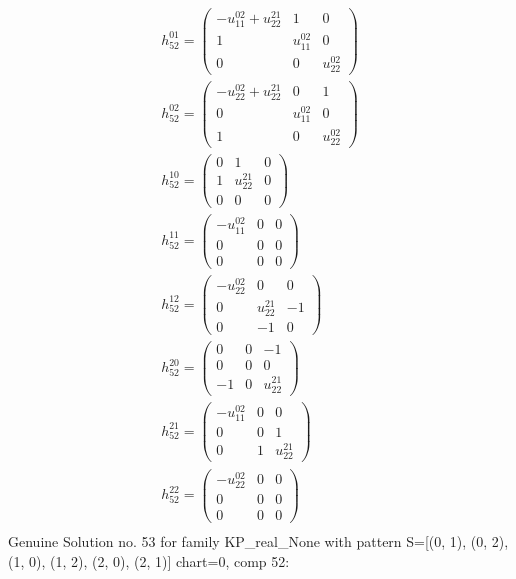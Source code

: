 \documentclass[a4paper, 11pt, twoside, onecolumn]{article}
\begin{document}
\begin{landscape}
\begin{gather*}
	 h_{52}^{01}=\begin{pmatrix}- u^{02}_{11} + u^{21}_{22} & 1 & 0\\1 & u^{02}_{11} & 0\\0 & 0 & u^{02}_{22}\end{pmatrix}\\ 
	 h_{52}^{02}=\begin{pmatrix}- u^{02}_{22} + u^{21}_{22} & 0 & 1\\0 & u^{02}_{11} & 0\\1 & 0 & u^{02}_{22}\end{pmatrix}\\ 
	 h_{52}^{10}=\begin{pmatrix}0 & 1 & 0\\1 & u^{21}_{22} & 0\\0 & 0 & 0\end{pmatrix}\\ 
	 h_{52}^{11}=\begin{pmatrix}- u^{02}_{11} & 0 & 0\\0 & 0 & 0\\0 & 0 & 0\end{pmatrix}\\ 
	 h_{52}^{12}=\begin{pmatrix}- u^{02}_{22} & 0 & 0\\0 & u^{21}_{22} & -1\\0 & -1 & 0\end{pmatrix}\\ 
	 h_{52}^{20}=\begin{pmatrix}0 & 0 & -1\\0 & 0 & 0\\-1 & 0 & u^{21}_{22}\end{pmatrix}\\ 
	 h_{52}^{21}=\begin{pmatrix}- u^{02}_{11} & 0 & 0\\0 & 0 & 1\\0 & 1 & u^{21}_{22}\end{pmatrix}\\ 
	 h_{52}^{22}=\begin{pmatrix}- u^{02}_{22} & 0 & 0\\0 & 0 & 0\\0 & 0 & 0\end{pmatrix}\\ 
\end{gather*} 
Genuine Solution no. 53 for family KP_real_None with pattern S=[(0, 1), (0, 2), (1, 0), (1, 2), (2, 0), (2, 1)] chart=0, comp 52: 
\begin{gather*} 

\end{gather*}
\end{landscape}
\end{document}
